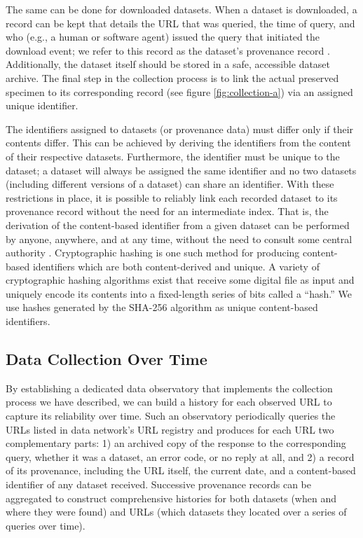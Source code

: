 % 

The same can be done for downloaded datasets. When a dataset is downloaded, a record can be kept that details the URL that was queried, the time of query, and who (e.g., a human or software agent) issued the query that initiated the download event; we refer to this record as the dataset's provenance record \citep{Pasquier_2017}. Additionally, the dataset itself should be stored in a safe, accessible dataset archive. The final step in the collection process is to link the actual preserved specimen to its corresponding record (see figure \ref{fig:collection-a}) via an assigned unique identifier.

The identifiers assigned to datasets (or provenance data) must differ only if their contents differ. This can be achieved by deriving the identifiers from the content of their respective datasets. Furthermore, the identifier must be unique to the dataset; a dataset will always be assigned the same identifier and no two datasets (including different versions of a dataset) can share an identifier. With these restrictions in place, it is possible to reliably link each recorded dataset to its provenance record without the need for an intermediate index. That is, the derivation of the content-based identifier from a given dataset can be performed by anyone, anywhere, and at any time, without the need to consult some central authority \citep{Paskin_1999}. Cryptographic hashing is one such method for producing content-based identifiers which are both content-derived and unique. A variety of cryptographic hashing algorithms exist that receive some digital file as input and uniquely encode its contents into a fixed-length series of bits called a ``hash.'' We use hashes generated by the SHA-256 algorithm  as unique content-based identifiers.

\subsection*{Data Collection Over Time}
By establishing a dedicated data observatory that implements the collection process we have described, we can build a history for each observed URL to capture its reliability over time. Such an observatory periodically queries the URLs listed in data network's URL registry and produces for each URL two complementary parts: 1) an archived copy of the response to the corresponding query, whether it was a dataset, an error code, or no reply at all, and 2) a record of its provenance, including the URL itself, the current date, and a content-based identifier of any dataset received. Successive provenance records can be aggregated to construct comprehensive histories for both datasets (when and where they were found) and URLs (which datasets they located over a series of queries over time).


